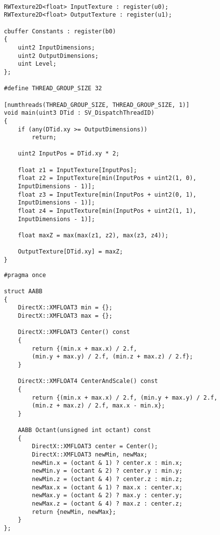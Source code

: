 \begin{lstlisting}

RWTexture2D<float> InputTexture : register(u0);
RWTexture2D<float> OutputTexture : register(u1);

cbuffer Constants : register(b0)
{
    uint2 InputDimensions;
    uint2 OutputDimensions;
    uint Level;
};

#define THREAD_GROUP_SIZE 32

[numthreads(THREAD_GROUP_SIZE, THREAD_GROUP_SIZE, 1)]
void main(uint3 DTid : SV_DispatchThreadID)
{
    if (any(DTid.xy >= OutputDimensions))
        return;

    uint2 InputPos = DTid.xy * 2;

    float z1 = InputTexture[InputPos];
    float z2 = InputTexture[min(InputPos + uint2(1, 0), 
    InputDimensions - 1)];
    float z3 = InputTexture[min(InputPos + uint2(0, 1), 
    InputDimensions - 1)];
    float z4 = InputTexture[min(InputPos + uint2(1, 1), 
    InputDimensions - 1)];

    float maxZ = max(max(z1, z2), max(z3, z4));

    OutputTexture[DTid.xy] = maxZ;
}

\end{lstlisting}

\begin{lstlisting}
#pragma once

struct AABB
{
    DirectX::XMFLOAT3 min = {};
    DirectX::XMFLOAT3 max = {};

    DirectX::XMFLOAT3 Center() const
    {
        return {(min.x + max.x) / 2.f, 
        (min.y + max.y) / 2.f, (min.z + max.z) / 2.f};
    }

    DirectX::XMFLOAT4 CenterAndScale() const
    {
        return {(min.x + max.x) / 2.f, (min.y + max.y) / 2.f, 
        (min.z + max.z) / 2.f, max.x - min.x};
    }

    AABB Octant(unsigned int octant) const
    {
        DirectX::XMFLOAT3 center = Center();
        DirectX::XMFLOAT3 newMin, newMax;
        newMin.x = (octant & 1) ? center.x : min.x;
        newMin.y = (octant & 2) ? center.y : min.y;
        newMin.z = (octant & 4) ? center.z : min.z;
        newMax.x = (octant & 1) ? max.x : center.x;
        newMax.y = (octant & 2) ? max.y : center.y;
        newMax.z = (octant & 4) ? max.z : center.z;
        return {newMin, newMax};
    }
};
\end{lstlisting}


